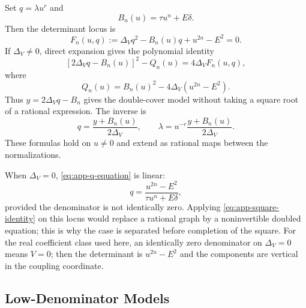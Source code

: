 \documentclass[11pt,reqno]{amsart}
\theoremstyle{remark}
\begin{document}
Set $q=\lambda u^r$ and
\begin{equation}\label{eq:app-Bn}
 B_n(u)=\tau u^n+E\delta.
\end{equation}
Then the determinant locus is
\begin{equation}\label{eq:app-q-equation}
 F_n(u,q):=\Delta_Vq^2-B_n(u)q+u^{2n}-E^2=0.
\end{equation}
If $\Delta_V\ne0$, direct expansion gives the polynomial identity
\begin{equation}\label{eq:app-square-identity}
 [2\Delta_Vq-B_n(u)]^2-Q_n(u)=4\Delta_VF_n(u,q),
\end{equation}
where
\begin{equation}\label{eq:app-Qn}
 Q_n(u)=B_n(u)^2-4\Delta_V(u^{2n}-E^2).
\end{equation}
Thus $y=2\Delta_Vq-B_n$ gives the double-cover model without taking a
square root of a rational expression.  The inverse is
\begin{equation}\label{eq:app-q-inverse}
 q=\frac{y+B_n(u)}{2\Delta_V},
 \qquad
 \lambda=u^{-r}\frac{y+B_n(u)}{2\Delta_V}.
\end{equation}
These formulas hold on $u\ne0$ and extend as rational maps between the
normalizations.

When $\Delta_V=0$, \eqref{eq:app-q-equation} is linear:
\begin{equation}\label{eq:app-linear-q}
 q=\frac{u^{2n}-E^2}{\tau u^n+E\delta},
\end{equation}
provided the denominator is not identically zero.  Applying
\eqref{eq:app-square-identity} on this locus would replace a rational graph by
a noninvertible doubled equation; this is why the case is separated before
completion of the square.  For the real coefficient class used here, an
identically zero denominator on $\Delta_V=0$ means $V=0$; then the determinant
is $u^{2n}-E^2$ and the components are vertical in the coupling coordinate.

\subsection{Low-Denominator Models}
\end{document}
